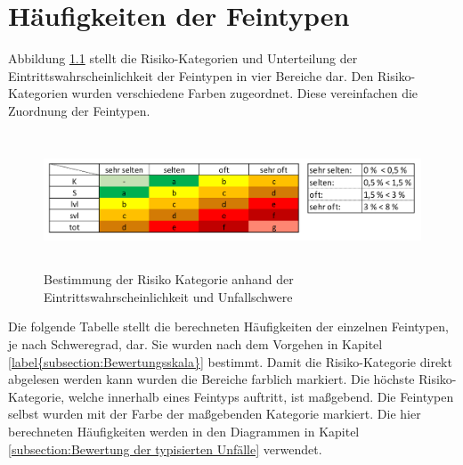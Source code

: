 
\chapter{Häufigkeiten der Feintypen}\label{chapter:Haeufigkeit_Feintypen}
Abbildung \ref{fig:Eintrittswahrscheinlichkeit} stellt die Risiko-Kategorien und Unterteilung der Eintrittswahrscheinlichkeit der Feintypen in vier Bereiche dar. Den Risiko-Kategorien wurden verschiedene Farben zugeordnet. Diese vereinfachen die Zuordnung der Feintypen.

\begin{savenotes}
	\begin{figure}[H]
		\centering
		\includegraphics[width=16cm,height=4cm]{figures/Eintrittswahrscheinlichkeit}
		\caption[Bestimmung der Risiko-Kategorie anhand der Eintrittswahrscheinlichkeit und Unfallschwer]{Bestimmung der Risiko Kategorie anhand der Eintrittswahrscheinlichkeit und Unfallschwere}\label{fig:Eintrittswahrscheinlichkeit}
	\end{figure}
\end{savenotes}

Die folgende Tabelle stellt die berechneten Häufigkeiten der einzelnen Feintypen, je nach Schweregrad, dar. Sie wurden nach dem Vorgehen in Kapitel \ref{label{subsection:Bewertungsskala}} bestimmt. Damit die Risiko-Kategorie direkt abgelesen werden kann wurden die Bereiche farblich markiert. Die höchste Risiko-Kategorie, welche innerhalb eines Feintyps auftritt, ist maßgebend. Die Feintypen selbst wurden mit der Farbe der maßgebenden Kategorie markiert. Die hier berechneten Häufigkeiten werden in den Diagrammen in Kapitel \ref{subsection:Bewertung der typisierten Unfälle} verwendet.
  

